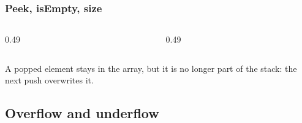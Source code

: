 \documentclass[aspectratio=169,10pt,compress]{beamer}
\begin{document}
\begin{frame}[t,fragile] \frametitle{Peek, isEmpty, size}
  \begin{columns}[T]
    \begin{column}{0.49\textwidth}
      \SetAlFnt{\small}


\begin{algorithm}[H]
  \caption{Peek}
  \;
\end{algorithm}

    \end{column}
    \begin{column}{0.49\textwidth}
      \SetAlFnt{\small}


\begin{algorithm}[H]
  \caption{IsEmpty and Size}
\end{algorithm}

    \end{column}
  \end{columns}
  \small A popped element stays in the array, but it is no longer part of the stack: the next push overwrites it.
\end{frame}

\subsection[Errors]{Overflow and underflow}
\end{document}
